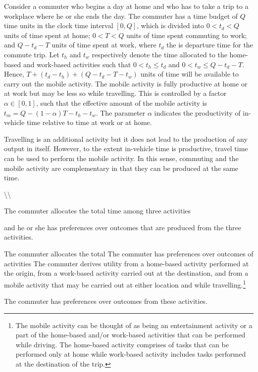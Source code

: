 \documentclass[12pt,a4paper,british]{article}
\theoremstyle{definition}
\theoremstyle{plain}
\theoremstyle{plain}
\begin{document}
Consider a commuter who begins a day at home and who has to take a
trip to a workplace where he or she ends the day. The commuter has
a time budget of $Q$ time units in the clock time interval $\left[0,Q\right]$,
which is divided into $0<t_{d}<Q$ units of time spent at home; $0<T<Q$
units of time spent commuting to work; and $Q-t_{d}-T$ units of time
spent at work, where $t_{d}$ the is departure time for the commute
trip. Let $t_{h}$ and $t_{w}$ respectively denote the time allocated
to the home-based and work-based activities such that $0<t_{h}\leq t_{d}$
and $0<t_{w}\leq Q-t_{d}-T$. Hence, $T+\left(t_{d}-t_{h}\right)+\left(Q-t_{d}-T-t_{w}\right)$
units of time will be available to carry out the mobile activity.
The mobile activity is fully productive at home or at work but may
be less so while travelling. This is controlled by a factor $\alpha\in\left[0,1\right]$,
such that the effective amount of the mobile activity is $t_{m}=Q-\left(1-\alpha\right)T-t_{h}-t_{w}$.
The parameter $\alpha$ indicates the productivity of in-vehicle time
relative to time at work or at home.

Travelling is an additional activity but it does not lead to the production
of any output in itself. However, to the extent in-vehicle time is
productive, travel time can be used to perform the mobile activity.
In this sense, commuting and the mobile activity are complementary
in that they can be produced at the same time.

\textbackslash\textbackslash{}

The commuter allocates the total time among three activities

and he or she has preferences over outcomes that are produced from
the three activities.

The commuter allocates the total The commuter has preferences over
outcomes of activities The commuter derives utility from a home-based
activity performed at the origin, from a work-based activity carried
out at the destination, and from a mobile activity that may be carried
out at either location and while travelling.\footnote{The mobile activity can be thought of as being an entertainment activity
or a part of the home-based and/or work-based activities that can
be performed while driving. The home-based activity comprises of tasks
that can be performed only at home while work-based activity includes
tasks performed at the destination of the trip.}

The commuter has preferences over outcomes from these activities.
\end{document}
